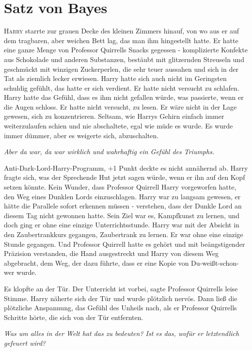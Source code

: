 \chapter{Satz von Bayes}

\lettrine{H}{arry} starrte zur grauen Decke des kleinen Zimmers hinauf, von wo aus er auf dem
tragbaren, aber weichen Bett lag, das man ihm hingestellt hatte. Er hatte eine
ganze Menge von Professor Quirrells Snacks gegessen - komplizierte Konfekte aus
Schokolade und anderen Substanzen, bestäubt mit glitzernden Streuseln und
geschmückt mit winzigen Zuckerperlen, die sehr teuer aussahen und sich in der
Tat als ziemlich lecker erwiesen. Harry hatte sich auch nicht im Geringsten
schuldig gefühlt, das hatte er sich verdient. Er hatte nicht versucht zu
schlafen. Harry hatte das Gefühl, dass es ihm nicht gefallen würde, was
passierte, wenn er die Augen schloss. Er hatte nicht versucht, zu lesen. Er wäre
nicht in der Lage gewesen, sich zu konzentrieren. Seltsam, wie Harrys Gehirn
einfach immer weiterzulaufen schien und nie abschaltete, egal wie müde es wurde.
Es wurde immer dümmer, aber es weigerte sich, abzuschalten.

\emph{Aber da war, da war wirklich und wahrhaftig ein Gefühl des Triumphs.}

Anti-Dark-Lord-Harry-Programm, +1 Punkt deckte es nicht annähernd ab. Harry
fragte sich, was der Sprechende Hut jetzt sagen würde, wenn er ihn auf den Kopf
setzen könnte. Kein Wunder, dass Professor Quirrell Harry vorgeworfen hatte, den
Weg eines Dunklen Lords einzuschlagen. Harry war zu langsam gewesen, er hätte
die Parallele sofort erkennen müssen - verstehen, dass der Dunkle Lord an diesem
Tag nicht gewonnen hatte. Sein Ziel war es, Kampfkunst zu lernen, und doch ging
er ohne eine einzige Unterrichtsstunde. Harry war mit der Absicht in den
Zaubertrankkurs gegangen, Zaubertrank zu lernen. Er war ohne eine einzige Stunde
gegangen. Und Professor Quirrell hatte es gehört und mit beängstigender
Präzision verstanden, die Hand ausgestreckt und Harry von diesem Weg abgebracht,
dem Weg, der dazu führte, dass er eine Kopie von Du-weißt-schon-wer wurde.

Es klopfte an der Tür. \glqq Der Unterricht ist vorbei\grqq{}, sagte Professor
Quirrells leise Stimme. Harry näherte sich der Tür und wurde plötzlich nervös.
Dann ließ die plötzliche Anspannung, das Gefühl des Unheils nach, als er
Professor Quirrells Schritte hörte, die sich von der Tür entfernten.

\emph{Was um alles in der Welt hat das zu bedeuten? Ist es das, wofür er
letztendlich gefeuert wird? }

